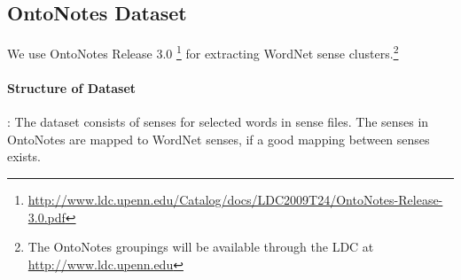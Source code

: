 \subsection{OntoNotes Dataset}
\label{sec:OntoNotesDataset}
We use OntoNotes \citep{Hovy:2006} Release 3.0 \footnote{\url{http://www.ldc.upenn.edu/Catalog/docs/LDC2009T24/OntoNotes-Release-3.0.pdf}} for extracting WordNet sense clusters.\footnote{The OntoNotes groupings will be available through the LDC at \url{http://www.ldc.upenn.edu}} 

\paragraph{Structure of Dataset}: The dataset consists of senses for selected words in sense files. The senses in OntoNotes are mapped to WordNet senses, if a good mapping between senses exists.


